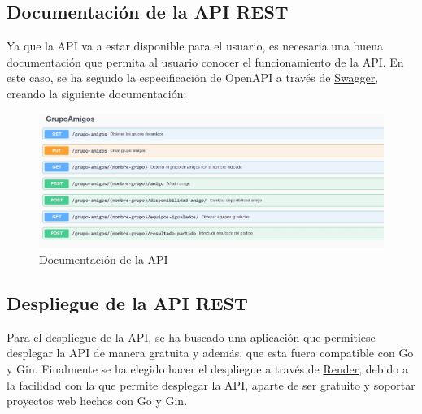 \subsection{Documentación de la API REST}
Ya que la API va a estar disponible para el usuario, es necesaria una buena documentación que permita al usuario conocer el funcionamiento de la API.
En este caso, se ha seguido la especificación de OpenAPI a través de \href{https://swagger.io/}{Swagger}, creando la siguiente documentación:

\begin{figure}[H]
	\centering	
	\includegraphics[scale=0.25]{img/doc-api.jpg}
	\caption{Documentación de la API}
\end{figure}

\subsection{Despliegue de la API REST}
Para el despliegue de la API, se ha buscado una aplicación que permitiese desplegar la API de manera gratuita y además, que esta fuera compatible con Go y Gin.
Finalmente se ha elegido hacer el despliegue a través de \href{https://render.com/}{Render}, debido a la facilidad con la que permite desplegar la API, aparte de ser gratuito y soportar proyectos web hechos con Go y Gin.